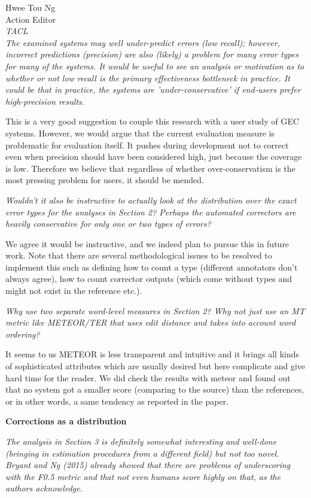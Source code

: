 \documentclass[11pt,letterpaper]{letter}
\begin{document}
\begin{letter}{%
Hwee Tou Ng\\
Action Editor\\
{\em TACL}\\
}
\emph{The examined systems may well under-predict errors (low recall); however,
	incorrect predictions (precision) are also (likely) a problem for many error
	types for many of the systems. It would be useful to see an analysis or
	motivation as to whether or not low recall is the primary effectiveness
	bottleneck in practice. It could be that in practice, the systems are
	'under-conservative' if end-users prefer high-precision results.
	}

This is a very good suggestion to couple this research with a user study of GEC systems. However, we would argue that the current evaluation measure is problematic for evaluation itself. It pushes during development not to correct even when precision should have been considered high, just because the coverage is low. Therefore we believe that regardless of whether over-conservatism is the most pressing problem for users, it should be mended. 

\emph{Wouldn't it also be instructive to actually look at the distribution
	over the exact error types for the analyses in Section 2? Perhaps the automated correctors are heavily conservative for only one or two types of errors?
	}
	
	We agree it would be instructive, and we indeed plan to pursue this in future work. Note that there are several methodological issues to be resolved to implement this such as defining how to count a type (different annotators don't always agree), how to count corrector outputs (which come without types and might not exist in the reference etc.).
	
\emph{Why use two separate word-level measures in Section 2? Why not just use
	an MT metric like METEOR/TER that uses edit distance and takes into account
	word ordering?}

It seems to us METEOR is less transparent and intuitive and it brings all kinds of sophisticated attributes which are usually desired but here complicate and give hard time for the reader. We did check the results with meteor and found out that no system got a smaller score (comparing to the source) than the references, or in other words, a same tendency as reported in the paper.

{\bf Corrections as a distribution}

\emph{The analysis in Section 3 is definitely somewhat interesting and
	well-done (bringing in estimation procedures from a different field) but not
	too novel. Bryant and Ng (2015) already showed that there are problems of
	underscoring with the F0.5 metric and that not even humans score highly on
	that, as the authors acknowledge.
	}
	

\end{letter}
\end{document}
